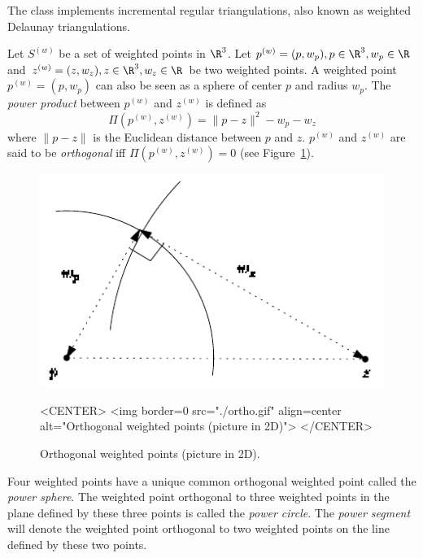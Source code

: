 The class  implements incremental regular
triangulations, also known as weighted Delaunay triangulations.

Let ${S}^{(w)}$ be a set of weighted points in $\R^3$. Let
${p}^{(w)}=(p,w_p), p\in\R^3, w_p\in\R$ and 
${z}^{(w)}=(z,w_z), z\in\R^3, w_z\in\R$ be two weighted points. 
A weighted point
${p}^{(w)}=(p,w_p)$ can also be seen as a sphere of center $p$ and
radius $w_p$. 
The \textit{power product} between ${p}^{(w)}$ and ${z}^{(w)}$ is
defined as 
\[\Pi({p}^{(w)},{z}^{(w)}) = {\|{p-z}\|^2-w_p-w_z}\]
where $\|{p-z}\|$ is the Euclidean distance between $p$ and $z$. 
 ${p}^{(w)}$ and ${z}^{(w)}$
are said to be \textit{orthogonal} iff $\Pi{({p}^{(w)},{z}^{(w)})}
= 0$ (see Figure~\ref{Triangulation3-fig-ortho}).

\begin{figure}[htbp]
\begin{ccTexOnly}
\begin{center} 
\includegraphics{Triangulation_3/ortho} 
\end{center}
\end{ccTexOnly}
\caption{Orthogonal weighted points (picture in 2D).
\label{Triangulation3-fig-ortho}}
\begin{ccHtmlOnly}
<CENTER>
<img border=0 src="./ortho.gif" align=center alt="Orthogonal weighted
points (picture in 2D)"> 
</CENTER>
\end{ccHtmlOnly}
\end{figure} 

Four weighted points have a unique common orthogonal weighted point
called the \textit{power sphere}.  The weighted point orthogonal to
three weighted points in the plane defined by these three points is
called the \textit{power circle}. The
\textit{power segment} will denote the weighted point orthogonal to
two weighted points on the line defined by these two points.


